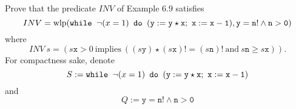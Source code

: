 Prove that the predicate $INV$ of Example 6.9 satisfies
\begin{equation*}
	INV=\mathrm{wlp}(\texttt{while } \neg(x=1) \texttt{ do } \mathtt{(y:=y\star x;\ x:=x-1)},\mathtt{y=n!\land n>0})
\end{equation*}
where
\begin{equation*}
INV\ s=(s \mathtt{x}>0\ \mathrm{implies}\ ((s \mathtt{y})\star(s \mathtt{x})!=(s \mathtt{n})!\ \mathrm{and}\ s \mathtt{n}\geq s \mathtt{x})).
\end{equation*}
For compactness sake, denote
\begin{equation*}
S:=\swhile{\neg(x=1)}{\mathtt{(y:=y\star x;\ x:=x-1)}}
\end{equation*}
and
\begin{equation*}
Q:=\mathtt{y=n!\land n>0}
\end{equation*}
